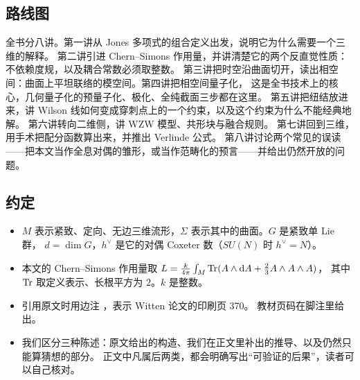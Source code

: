 \subsection*{路线图}

全书分八讲。第一讲从 Jones 多项式的组合定义出发，说明它为什么需要一个三维的解释。
第二讲引进 Chern--Simons 作用量，并讲清楚它的两个反直觉性质：不依赖度规，以及耦合常数必须取整数。
第三讲把时空沿曲面切开，读出相空间：曲面上平坦联络的模空间。第四讲把相空间量子化，
这是全书技术上的核心，几何量子化的预量子化、极化、全纯截面三步都在这里。
第五讲把纽结放进来，讲 Wilson 线如何变成穿刺点上的一个约束，以及这个约束为什么不能经典地解。
第六讲转向二维侧，讲 WZW 模型、共形块与融合规则。
第七讲回到三维，用手术把配分函数算出来，并推出 Verlinde 公式。
第八讲讨论两个常见的误读——把本文当作全息对偶的雏形，或当作范畴化的预言——并给出仍然开放的问题。

\subsection*{约定}

\begin{itemize}[leftmargin=*]
  \item $M$ 表示紧致、定向、无边三维流形，$\Sigma$ 表示其中的曲面。$G$ 是紧致单 Lie 群，
        $d=\dim G$，$h^\vee$ 是它的对偶 Coxeter 数（$SU(N)$ 时 $h^\vee=N$）。
  \item 本文的 Chern--Simons 作用量取
        $L=\frac{k}{4\pi}\int_M\operatorname{Tr}(A\wedge\mathrm{d} A+\frac23A\wedge A\wedge A)$，
        其中 $\operatorname{Tr}$ 取定义表示、长根平方为 $2$。$k$ 是整数。
  \item 引用原文时用边注 ，表示 Witten 论文的印刷页 370。
        教材页码在脚注里给出。
  \item 我们区分三种陈述：原文给出的构造、我们在正文里补出的推导、以及仍然只能算猜想的部分。
        正文中凡属后两类，都会明确写出“可验证的后果”，读者可以自己核对。
\end{itemize}
